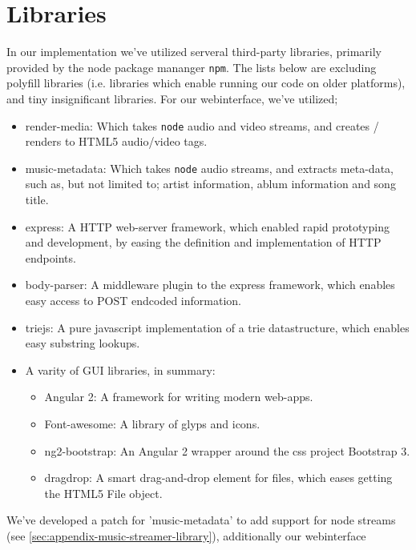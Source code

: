 \section{Libraries}
In our implementation we've utilized serveral third-party libraries, primarily
provided by the node package mananger \verb|npm|. The lists below are excluding
polyfill libraries (i.e. libraries which enable running our code on older
platforms), and tiny insignificant libraries.
\newline\newline
For our webinterface, we've utilized;
\begin{itemize}
\item render-media: Which takes \verb|node| audio and video streams, and
        creates / renders to HTML5 audio/video tags.
\item music-metadata: Which takes \verb|node| audio streams, and extracts
        meta-data, such as, but not limited to; artist information, ablum 
        information and song title.
\item express: A HTTP web-server framework, which enabled rapid prototyping and
        development, by easing the definition and implementation of HTTP endpoints.
\item body-parser: A middleware plugin to the express framework, which enables 
        easy access to POST endcoded information.
\item triejs: A pure javascript implementation of a trie datastructure, which 
        enables easy substring lookups.
\item A varity of GUI libraries, in summary:
\begin{itemize}
\item Angular 2: A framework for writing modern web-apps.
\item Font-awesome: A library of glyps and icons.
\item ng2-bootstrap: An Angular 2 wrapper around the css project Bootstrap 3.
\item dragdrop: A smart drag-and-drop element for files, which eases getting
        the HTML5 File object.
\end{itemize}
\end{itemize}
We've developed a patch for 'music-metadata' to add support for node streams
(see \ref{sec:appendix-music-streamer-library}), additionally our webinterface
